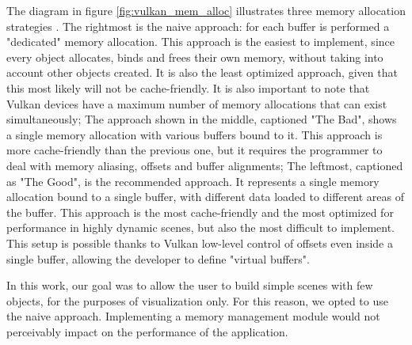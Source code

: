 The diagram in figure \ref{fig:vulkan_mem_alloc} illustrates three memory allocation strategies \cite{vulkan_mem_mgmt}.
The rightmost is the naive approach: for each buffer is performed a "dedicated" memory allocation. This approach is the easiest to implement, since every object allocates, binds and frees their own memory, without taking into account other objects created. It is also the least optimized approach, given that this most likely will not be cache-friendly. It is also important to note that Vulkan devices have a maximum number of memory allocations that can exist simultaneously;
The approach shown in the middle, captioned "The Bad", shows a single memory allocation with various buffers bound to it. This approach is more cache-friendly than the previous one, but it requires the programmer to deal with memory aliasing, offsets and buffer alignments;
The leftmost, captioned as "The Good", is the recommended approach. It represents a single memory allocation bound to a single buffer, with different data loaded to different areas of the buffer. This approach is the most cache-friendly and the most optimized for performance in highly dynamic scenes, but also the most difficult to implement. This setup is possible thanks to Vulkan low-level control of offsets even inside a single buffer, allowing the developer to define "virtual buffers".

In this work, our goal was to allow the user to build simple scenes with few objects, for the purposes of visualization only. For this reason, we opted to use the naive approach. Implementing a memory management module would not perceivably impact on the performance of the application.
